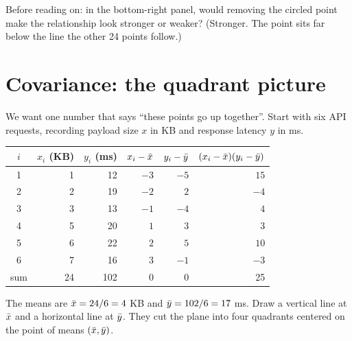 \begin{recoverybox}
Before reading on: in the bottom-right panel, would removing the circled point make
the relationship look stronger or weaker? (Stronger. The point sits far below the
line the other 24 points follow.)
\end{recoverybox}

\section{Covariance: the quadrant picture}
\label{sec:corr-covariance}

We want one number that says ``these points go up together''. Start with six API
requests, recording payload size $x$ in KB and response latency $y$ in ms.

\begin{center}
\begin{tabular}{crrrrr}
\toprule
$i$ & $x_i$ (KB) & $y_i$ (ms) & $x_i - \bar{x}$ & $y_i - \bar{y}$ & $(x_i-\bar{x})(y_i-\bar{y})$ \\
\midrule
1 & 1 & 12 & $-3$ & $-5$ & $15$ \\
2 & 2 & 19 & $-2$ & $2$ & $-4$ \\
3 & 3 & 13 & $-1$ & $-4$ & $4$ \\
4 & 5 & 20 & $1$ & $3$ & $3$ \\
5 & 6 & 22 & $2$ & $5$ & $10$ \\
6 & 7 & 16 & $3$ & $-1$ & $-3$ \\
\midrule
sum & 24 & 102 & 0 & 0 & 25 \\
\bottomrule
\end{tabular}
\end{center}

The means are $\bar{x} = 24/6 = 4$ KB and $\bar{y} = 102/6 = 17$ ms. Draw a vertical
line at $\bar{x}$ and a horizontal line at $\bar{y}$. They cut the plane into four
quadrants centered on the point of means $(\bar{x}, \bar{y})$.

